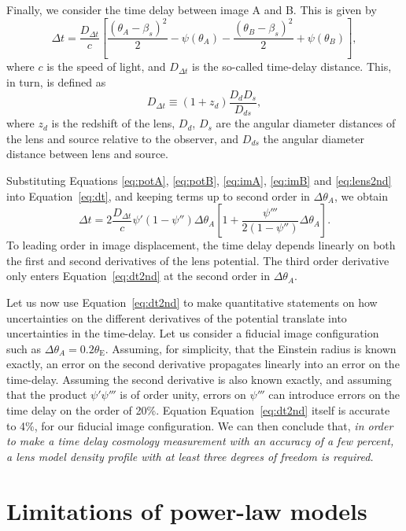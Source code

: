 \documentclass[usenatbib]{mnras}
\def\psii{\psi'}
\def\psiii{\psi''}
\def\psiiii{\psi'''}
\def\tein{\theta_{\mathrm{E}}}
\def\Eref#1{Equation~\ref{#1}\xspace}
\begin{document}
Finally, we consider the time delay between image A and B. This is given by
\begin{equation}\label{eq:dt}
\Delta t = \frac{D_{\Delta t}}{c}\left[\frac{(\theta_A - \beta_s)^2}{2} - \psi(\theta_A) - \frac{(\theta_B - \beta_s)^2}{2} + \psi(\theta_B)\right],
\end{equation}
where $c$ is the speed of light, and $D_{\Delta t}$ is the so-called time-delay distance. This, in turn, is defined as
\begin{equation}
D_{\Delta t} \equiv (1+z_d) \frac{D_d D_s}{D_{ds}},
\end{equation}
where $z_d$ is the redshift of the lens, $D_d$, $D_s$ are the angular diameter distances of the lens and source relative to the observer, and $D_{ds}$ the angular diameter distance between lens and source. 

Substituting Equations \ref{eq:potA}, \ref{eq:potB}, \ref{eq:imA}, \ref{eq:imB} and \ref{eq:lens2nd} into \Eref{eq:dt}, and keeping terms up to second order in $\Delta\theta_A$, we obtain
\begin{equation}\label{eq:dt2nd}
\Delta t = 2\frac{D_{\Delta t}}{c}\psii(1 - \psiii)\Delta\theta_A\left[1 + \frac{\psiiii}{2(1 - \psiii)}\Delta\theta_A\right].
\end{equation}
%
To leading order in image displacement, the time delay depends linearly on both the first and second derivatives of the lens potential. The third order derivative only enters \Eref{eq:dt2nd} at the second order in $\Delta\theta_A$.

Let us now use \Eref{eq:dt2nd} to make quantitative statements on how uncertainties on the different derivatives of the potential translate into uncertainties in the time-delay.
Let us consider a fiducial image configuration such as $\Delta\theta_A = 0.2\tein$.
Assuming, for simplicity, that the Einstein radius is known exactly, an error on the second derivative propagates linearly into an error on the time-delay. Assuming the second derivative is also known exactly, and assuming that the product $\psii\psiiii$ is of order unity, errors on $\psiiii$ can introduce errors on the time delay on the order of 20\%.
Equation \Eref{eq:dt2nd} itself is accurate to 4\%, for our fiducial image configuration.
We can then conclude that, {\em in order to make a time delay cosmology measurement with an accuracy of a few percent, a lens model density profile with at least three degrees of freedom is required.}

\section{Limitations of power-law models}\label{sect:pl}
\end{document}

